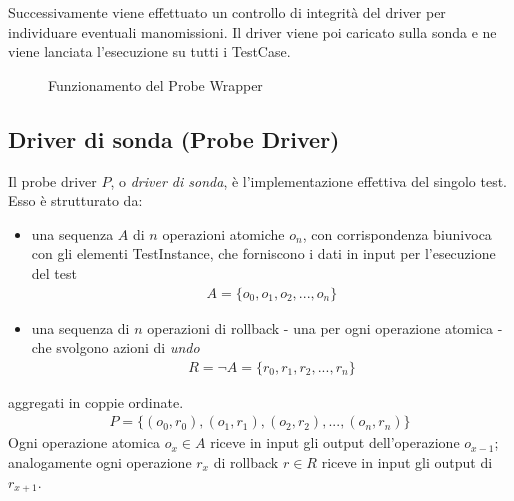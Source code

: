 \documentclass[../main.tex]{subfiles}
\begin{document}
Successivamente viene effettuato un controllo di integrità del driver per individuare eventuali manomissioni.
Il driver viene poi caricato sulla sonda e ne viene lanciata l'esecuzione su tutti i TestCase.
\begin{figure}[H]
\centering
{}
\caption{Funzionamento del Probe Wrapper}\label{fig:ProbeWrapper}
\end{figure}
\newpage
\subsection {Driver di sonda (Probe Driver)}
Il probe driver $P$, o \textit{driver di sonda}, è l'implementazione effettiva del singolo test.
Esso è strutturato da:
\begin{itemize}
\item una sequenza $A$ di $n$ operazioni atomiche $o_n$, con corrispondenza biunivoca con gli elementi TestInstance\cite{CumulusBigDoc}, che forniscono i dati in input per l'esecuzione del test
\begin{align*}
A = \{ o_0, o_1, o_2, ... , o_n \}
\end{align*}
\item una sequenza di $n$ operazioni di rollback - una per ogni operazione atomica - che svolgono azioni di \textit{undo}
\begin{align*}
R = \lnot A = \{ r_0, r_1, r_2, ... , r_n \}
\end{align*}
\end{itemize}
aggregati in coppie ordinate.
\begin{align*}
P = \{ (o_0, r_0), (o_1, r_1) , (o_2, r_2) , ... , (o_n, r_n)\}
\end{align*}
Ogni operazione atomica $o_x \in A$ riceve in input gli output dell'operazione $o_{x-1}$; analogamente ogni operazione $r_x$ di rollback $r \in R$ riceve in input gli output di $r_{x+1}$.
\end{document}
